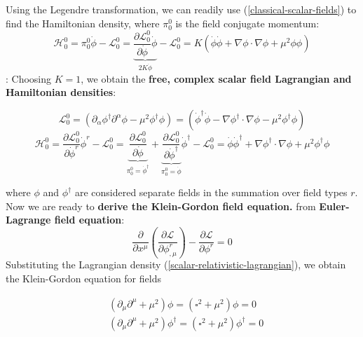 Using the Legendre transformation, we can readily use (\ref{classical-scalar-fields}) to find the Hamiltonian density, where $\pi_0^0$ is the field conjugate momentum:
\begin{equation}
\mathcal{H}_{0}^{0}=\pi_{0}^{0} \dot{\phi}-\mathcal{L}_{0}^{0}=\underbrace{\frac{\partial \mathcal{L}_{0}^{0}}{\partial \dot{\phi}} \dot{\phi}}_{2 K \dot{\phi}} -\mathcal{L}_{0}^{0}=K\left(\dot{\phi} \dot{\phi}+\nabla \phi \cdot \nabla \phi+\mu^{2} \phi \phi\right)
\label{classical-scalar-fields-hamil}
\end{equation}
:  Choosing $K=1$, we obtain the \textbf{free, complex scalar field Lagrangian and Hamiltonian densities}:
\begin{qt}
    \begin{equation}
\mathcal{L}_{0}^{0}=\left(\partial_{\alpha} \phi^{\dagger} \partial^{\alpha} \phi-\mu^{2} \phi^{\dagger} \phi\right)=\left(\dot{\phi}^{\dagger} \dot{\phi}-\nabla \phi^{\dagger} \cdot \nabla \phi-\mu^{2} \phi^{\dagger} \phi\right)
\label{scalar-relativistic-lagrangian}
\end{equation}
\begin{equation}
\mathcal{H}_{0}^{0}=\frac{\partial \mathcal{L}_{0}^{0}}{\partial \dot{\phi}^{r}} \dot{\phi}^{r}-\mathcal{L}_{0}^{0}=\underbrace{\frac{\partial \mathcal{L}_{0}^{0}}{\partial \dot{\phi}}}_{\pi_{0}^{0}=\dot{\phi}^{\dagger}} + \underbrace{\frac{\partial \mathcal{L}_{0}^{0}}{\partial \dot{\phi}^{\dagger}}}_{\pi_{0}^{0}=\dot{\phi}} \dot{\phi}^{\dagger}-\mathcal{L}_{0}^{0}=\dot{\phi} \dot{\phi}^{\dagger}+\nabla \phi^{\dagger} \cdot \nabla \phi+\mu^{2} \phi^{\dagger} \phi
\label{scalar-relativistic-hamil}
\end{equation}
\end{qt}
where $\phi$ and $\phi^{\dagger}$ are considered separate fields in the summation over field types $r$. Now we are ready to \textbf{derive the Klein-Gordon field equation.} from \textbf{Euler-Lagrange field equation}:
\begin{equation}
\frac{\partial}{\partial x^{\mu}}\left(\frac{\partial \mathcal{L}}{\partial \phi_{, \mu}^{r}}\right)-\frac{\partial \mathcal{L}}{\partial \phi^{r}}=0
\end{equation}
Substituting the Lagrangian density (\ref{scalar-relativistic-lagrangian}), we obtain the Klein-Gordon equation for fields
\begin{qt}
    \begin{equation}
\begin{aligned}
&\left(\partial_{\mu} \partial^{\mu}+\mu^{2}\right) \phi=\left(\square^{2}+\mu^{2}\right) \phi=0\\
&\left(\partial_{\mu} \partial^{\mu}+\mu^{2}\right) \phi^{\dagger}=\left(\square^{2}+\mu^{2}\right) \phi^{\dagger}=0
\end{aligned}
\label{klein-gordon-field-eq}
\end{equation}
\end{qt}
